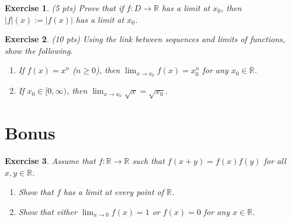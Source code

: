 \documentclass[12pt]{article}
\newcommand{\bR}{\mathbb{R}}
\newcommand{\ra}{\rightarrow}
\theoremstyle{plain}
\newtheorem{exer}{\textbf{Exercise}}}
\theoremstyle{plain}
\begin{document}
\begin{exer}
(5 pts)
Prove that if $f: D \ra \bR$ has a limit at $x_0$, then $|f|(x) := |f(x)|$ has a limit at $x_0$.
\end{exer}

\begin{exer}
(10 pts)
Using the link between sequences and limits of functions, show the following.
	\begin{enumerate}[label=\textbf{\alph*)}]
	\item If $f(x) = x^n$ ($n \geq 0$), then $\lim_{x \ra x_0} f(x) = x_0^n$ for any $x_0 \in \bR$.
	\item If $x_0 \in [0, \infty )$, then $\lim_{x \ra x_0} \sqrt{x} = \sqrt{x_0}$.
\end{enumerate}	 
\end{exer}

\section{Bonus}
\begin{exer}
Assume that $f : \bR \ra \bR$ such that $f(x + y) = f(x) f(y)$ for all $x, y \in \bR$.
	\begin{enumerate}[label=\textbf{\alph*)}]
	\item Show that $f$ has a limit at every point of $\bR$.
	\item Show that either $\lim_{x \ra 0} f(x) = 1$ or $f(x) = 0$ for any $x \in \bR$.
	\end{enumerate}
\end{exer}
\end{document}
